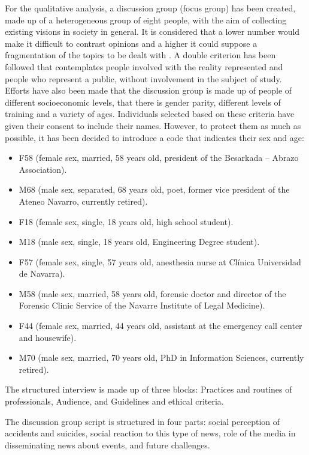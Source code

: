 For the qualitative analysis, a discussion group (focus group) has been
created, made up of a heterogeneous group of eight people, with the aim
of collecting existing visions in society in general. It is considered
that a lower number would make it difficult to contrast opinions and a
higher it could suppose a fragmentation of the topics to be dealt with
\cite{krueger2002designing}. A double criterion has been followed that
contemplates people involved with the reality represented and people who
represent a public, without involvement in the subject of study. Efforts
have also been made that the discussion group is made up of people of
different socioeconomic levels, that there is gender parity, different
levels of training and a variety of ages. Individuals selected based on
these criteria have given their consent to include their names. However,
to protect them as much as possible, it has been decided to introduce a
code that indicates their sex and age:

\begin{itemize}
	\item F58 (female sex, married, 58 years old, president of the Besarkada --
Abrazo Association).
\item M68 (male sex, separated, 68 years old, poet, former vice president of
the Ateneo Navarro, currently retired).
\item F18 (female sex, single, 18 years old, high school student).
\item M18 (male sex, single, 18 years old, Engineering Degree student).
\item F57 (female sex, single, 57 years old, anesthesia nurse at Clínica
Universidad de Navarra).
\item M58 (male sex, married, 58 years old, forensic doctor and director of
the Forensic Clinic Service of the Navarre Institute of Legal Medicine).
\item F44 (female sex, married, 44 years old, assistant at the emergency
call center and housewife).
\item M70 (male sex, married, 70 years old, PhD in Information Sciences,
currently retired).
\end{itemize}

The structured interview is made up of three blocks: Practices and
routines of professionals, Audience, and Guidelines and ethical
criteria.

The discussion group script is structured in four parts: social
perception of accidents and suicides, social reaction to this type of
news, role of the media in disseminating news about events, and future
challenges.
